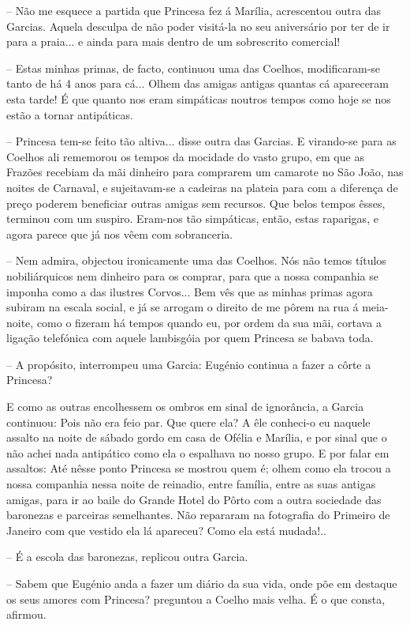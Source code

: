 \documentclass[9pt]{article}
\begin{document}
-- Não me esquece a partida que Princesa fez á Marília, acrescentou
outra das Garcias. Aquela desculpa de não poder visitá-la no seu aniversário por ter de ir para a praia... e ainda para mais dentro de um sobrescrito comercial!

-- Estas minhas primas, de facto, continuou uma das Coe\-lhos, modifi\-caram-se tanto de há 4 anos para cá... O\-lhem das amigas antigas quantas
cá apareceram esta tarde! É que quanto nos eram simpáticas noutros tempos como hoje se nos estão a tornar antipáticas.

-- Princesa tem-se feito tão altiva... disse outra das Garcias. E
viran\-do-se para as Coe\-lhos ali rememorou os tempos da mocidade do vasto
grupo, em que as Frazões recebiam da mãi dinheiro para comprarem um camarote no São João, nas noites de Carnaval, e sujeitavam-se a cadeiras na
plateia para com a diferença de preço poderem beneficiar outras amigas
sem recursos. Que belos tempos êsses, terminou com um suspiro. Eram-nos
tão simpáticas, então, estas raparigas, e agora parece que já nos vêem com
sobranceria.

-- Nem admira, objectou ironicamente uma das Coe\-lhos. Nós não temos
títulos nobiliárquicos nem dinheiro para os comprar, para que a nossa
companhia se imponha como a das ilustres Corvos... Bem vês que as minhas primas agora subiram na escala social, e já se arrogam o direito
de me pôrem na rua á meia-noite, como o fizeram há tempos quan\-do eu, por
ordem da sua mãi, cortava a liga\-ção telefónica com aquele lambisgóia por
quem Princesa se babava toda.

-- A propósito, interrompeu uma Garcia: Eugé\-nio continua a fazer
a côrte a Princesa?

E como as outras enco\-lhessem os ombros em sinal de ignorância, a
Garcia continuou: Pois não era feio par. Que quere ela? A êle conheci-o eu naquele assalto na noite de sábado gordo em casa de Ofélia e
Marília, e por sinal que o não achei nada antipático como ela o espa\-lhava
no nosso grupo. E por falar em assaltos: Até nêsse ponto Princesa se
mostrou quem é; o\-lhem como ela trocou a nossa companhia nessa noite de
reinadio, entre fa\-mí\-lia, entre as suas antigas amigas, para ir ao baile
do Grande Hotel do Pôrto com a outra sociedade das baronezas e parceiras
seme\-lhantes. Não repararam na fotografia do Primeiro de Janeiro com que
vestido ela lá apareceu? Como ela está mudada!..

-- É a escola das baronezas, replicou outra Garcia.

-- Sabem que Eugé\-nio anda a fazer um diário da sua vida, onde põe
em destaque os seus amores com Princesa? preguntou a Coe\-lho mais ve\-lha.
É o que consta, afirmou.
\end{document}
